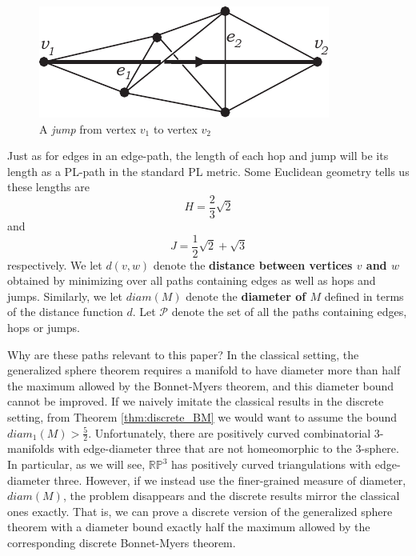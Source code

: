 \documentclass[12pt]{article}
\begin{document}
\begin{figure}
    \label{fig:jump}
    \begin{center}
        \includegraphics[width=0.4\linewidth]{figures/jump.pdf}
        \caption{A {\em jump} from vertex $v_1$ to vertex $v_2$}
    \end{center}
\end{figure}

\noindent Just as for edges in an edge-path, the length of each hop and jump will be its length as a PL-path in the standard PL metric. Some Euclidean geometry tells us these lengths are \begin{equation} \label{eqn:jump_length} H = \frac{2}{3}\sqrt{2} \end{equation} and \begin{equation} \label{eqn:jump_length} J = \frac{1}{2}\sqrt{2} + \sqrt{3} \end{equation} respectively. We let $d(v,w)$ denote the \textbf{distance between vertices $v$ and $w$} obtained by minimizing over all paths containing edges as well as hops and jumps. Similarly, we let $diam(M)$ denote the \textbf{diameter of $M$} defined in terms of the distance function $d$. Let $\mathcal{P}$ denote the set of all the paths containing edges, hops or jumps.

Why are these paths relevant to this paper? In the classical setting, the generalized sphere theorem requires a manifold to have diameter more than half the maximum allowed by the Bonnet-Myers theorem, and this diameter bound cannot be improved. If we naively imitate the classical results in the discrete setting, from Theorem \ref{thm:discrete_BM} we would want to assume the bound $diam_1(M)>\frac{5}{2}$. Unfortunately, there are positively curved combinatorial 3-manifolds with edge-diameter three that are not homeomorphic to the 3-sphere. In particular, as we will see, $\mathbb{RP}^3$ has positively curved triangulations with edge-diameter three. However, if we instead use the finer-grained measure of diameter, $diam(M)$, the problem disappears and the discrete results mirror the classical ones exactly. That is, we can prove a discrete version of the generalized sphere theorem with a diameter bound exactly half the maximum allowed by the corresponding discrete Bonnet-Myers theorem.
\end{document}
